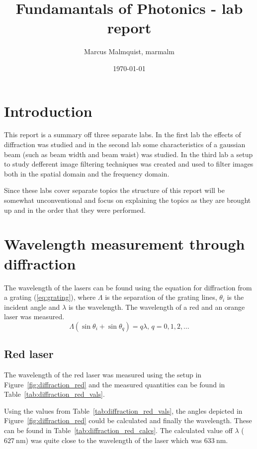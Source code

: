 \documentclass[12pt,a4paper]{article}
\title{Fundamantals of Photonics - lab report}
\author{Marcus Malmquist, marmalm}
\date{\today}
\begin{document}
\maketitle
\newpage
{}
\tableofcontents
\newpage
{}

\section{Introduction}
This report is a summary off three separate labs. In the first lab the effects of diffraction was studied and in the second lab some characteristics of a gaussian beam (such as beam width and beam waist) was studied. In the third lab a setup to study defferent image filtering techniques was created and used to filter images both in the spatial domain and the frequency domain.

Since these labs cover separate topics the structure of this report will be somewhat unconventional and focus on explaining the topics as they are brought up and in the order that they were performed.
\section{Wavelength measurement
  through diffraction}
The wavelength of the lasers can be found using the equation for diffraction from a grating (\ref{eq:grating}), where $\Lambda$ is the separation of the grating lines, $\theta_i$ is the incident angle and $\lambda$ is the wavelength. The wavelength of a red and an orange laser was measured.
\begin{equation}
  \label{eq:grating}
  \Lambda(\sin\theta_i+\sin\theta_q)=q\lambda \text{, }q=0,1,2,...
\end{equation}
\subsection{Red laser}
The wavelength of the red laser was measured using the setup in Figure~\ref{fig:diffraction_red} and the measured quantities can be found in Table~\ref{tab:diffraction_red_vals}.

Using the values from Table~\ref{tab:diffraction_red_vals}, the angles depicted in Figure~\ref{fig:diffraction_red} could be calculated and finally the wavelength. These can be found in Table~\ref{tab:diffraction_red_calcs}. The calculated value off $\lambda$ ($\SI{627}{\nano\metre}$) was quite close to the wavelength of the laser which was $\SI{633}{\nano\metre}$.
\end{document}
